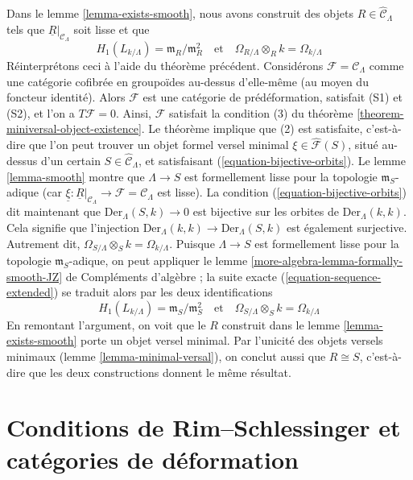 \begin{example}
\label{example-smooth-continued}
Dans le lemme \ref{lemma-exists-smooth}, nous avons construit des objets
$R \in \widehat{\mathcal{C}}_\Lambda$ tels que
$\underline{R}|_{\mathcal{C}_\Lambda}$ soit lisse et que
$$
H_1(L_{k/\Lambda}) = \mathfrak m_R/\mathfrak m_R^2
\quad\text{et}\quad
\Omega_{R/\Lambda} \otimes_R k = \Omega_{k/\Lambda}
$$
Réinterprétons ceci à l'aide du théorème précédent. Considérons
$\mathcal{F} = \mathcal{C}_\Lambda$ comme une catégorie cofibrée en
groupoïdes au-dessus d'elle-même (au moyen du foncteur identité). Alors
$\mathcal{F}$ est une catégorie de prédéformation, satisfait (S1) et (S2), et
l'on a $T\mathcal{F} = 0$. Ainsi, $\mathcal{F}$ satisfait la condition (3) du
théorème \ref{theorem-miniversal-object-existence}. Le théorème implique que
(2) est satisfaite, c'est-à-dire que l'on peut trouver un objet formel versel
minimal $\xi \in \widehat{\mathcal{F}}(S)$, situé au-dessus d'un certain
$S \in \widehat{\mathcal{C}}_\Lambda$, et satisfaisant
(\ref{equation-bijective-orbits}). Le lemme \ref{lemma-smooth} montre que
$\Lambda \to S$ est formellement lisse pour la topologie
$\mathfrak m_S$-adique (car
$\underline{\xi} : \underline{R}|_{\mathcal{C}_\Lambda} \to
\mathcal{F} = \mathcal{C}_\Lambda$ est lisse). La condition
(\ref{equation-bijective-orbits}) dit maintenant que
$\text{Der}_\Lambda(S, k) \to 0$ est bijective sur les orbites de
$\text{Der}_\Lambda(k, k)$. Cela signifie que l'injection
$\text{Der}_\Lambda(k, k) \to \text{Der}_\Lambda(S, k)$ est également
surjective. Autrement dit,
$\Omega_{S/\Lambda} \otimes_S k = \Omega_{k/\Lambda}$. Puisque
$\Lambda \to S$ est formellement lisse pour la topologie
$\mathfrak m_S$-adique, on peut appliquer le lemme
\ref{more-algebra-lemma-formally-smooth-JZ} de Compléments d'algèbre ; la suite
exacte (\ref{equation-sequence-extended}) se traduit alors par les deux identifications
$$
H_1(L_{k/\Lambda}) = \mathfrak m_S/\mathfrak m_S^2
\quad\text{et}\quad
\Omega_{S/\Lambda} \otimes_S k = \Omega_{k/\Lambda}
$$
En remontant l'argument, on voit que le $R$ construit dans le lemme
\ref{lemma-exists-smooth} porte un objet versel minimal. Par l'unicité des
objets versels minimaux (lemme \ref{lemma-minimal-versal}), on conclut aussi
que $R \cong S$, c'est-à-dire que les deux constructions donnent le même
résultat.
\end{example}







\section{Conditions de Rim--Schlessinger et catégories de déformation}
\label{section-RS-condition}

